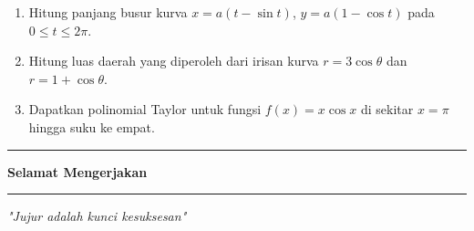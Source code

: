 \documentclass[10pt,openany,a4paper]{article}
\theoremstyle{definition}
\theoremstyle{definition}
\theoremstyle{plain}
\begin{document}
\begin{enumerate}






    \item Hitung panjang busur kurva $x=a(t-\sin t)$, $y=a(1-\cos t)$ pada $0\leq t\leq 2\pi$.
    \item Hitung luas daerah yang diperoleh dari irisan kurva $r=3\cos \theta$ dan $r=1+\cos\theta$.
    \item Dapatkan polinomial Taylor untuk fungsi $f(x)=x\cos x$ di sekitar $x=\pi$ hingga suku ke empat.
\end{enumerate}
\vfill
\begin{center}
    \noindent\rule{0.366416\linewidth}{2pt} \textbf{ Selamat Mengerjakan } \rule{0.366416\linewidth}{2pt}
\end{center}
\begin{center}
    \textit{"Jujur adalah kunci kesuksesan"}
\end{center}
\end{document}
